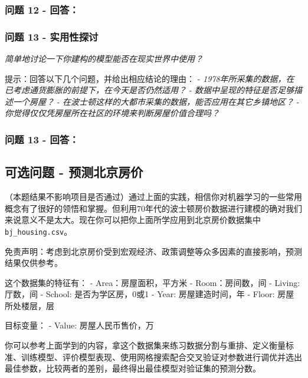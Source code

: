 \documentclass[11pt]{article}
\begin{document}
    \subsubsection{问题 12 - 回答：}\label{ux95eeux9898-12---ux56deux7b54}

    \subsubsection{问题 13 -
实用性探讨}\label{ux95eeux9898-13---ux5b9eux7528ux6027ux63a2ux8ba8}

\emph{简单地讨论一下你建构的模型能否在现实世界中使用？}

提示：回答以下几个问题，并给出相应结论的理由： -
\emph{1978年所采集的数据，在已考虑通货膨胀的前提下，在今天是否仍然适用？}
- \emph{数据中呈现的特征是否足够描述一个房屋？} -
\emph{在波士顿这样的大都市采集的数据，能否应用在其它乡镇地区？} -
\emph{你觉得仅仅凭房屋所在社区的环境来判断房屋价值合理吗？}

    \subsubsection{问题 13 - 回答：}\label{ux95eeux9898-13---ux56deux7b54}

    \subsection{可选问题 -
预测北京房价}\label{ux53efux9009ux95eeux9898---ux9884ux6d4bux5317ux4eacux623fux4ef7}

（本题结果不影响项目是否通过）通过上面的实践，相信你对机器学习的一些常用概念有了很好的领悟和掌握。但利用70年代的波士顿房价数据进行建模的确对我们来说意义不是太大。现在你可以把你上面所学应用到北京房价数据集中
\texttt{bj\_housing.csv}。

免责声明：考虑到北京房价受到宏观经济、政策调整等众多因素的直接影响，预测结果仅供参考。

这个数据集的特征有： - Area：房屋面积，平方米 - Room：房间数，间 -
Living: 厅数，间 - School: 是否为学区房，0或1 - Year: 房屋建造时间，年 -
Floor: 房屋所处楼层，层

目标变量： - Value: 房屋人民币售价，万

你可以参考上面学到的内容，拿这个数据集来练习数据分割与重排、定义衡量标准、训练模型、评价模型表现、使用网格搜索配合交叉验证对参数进行调优并选出最佳参数，比较两者的差别，最终得出最佳模型对验证集的预测分数。
\end{document}
